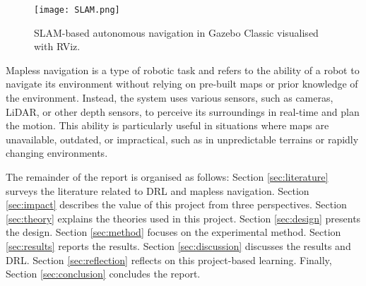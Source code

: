 \begin{figure}[htbp]
\centering
\texttt{[image: SLAM.png]}
\caption{SLAM-based autonomous navigation in Gazebo Classic visualised with RViz.}
\label{fig:slam}
\end{figure}

Mapless navigation is a type of robotic task and refers to the ability of a robot to navigate its environment without relying on pre-built maps or prior knowledge of the environment. Instead, the system uses various sensors, such as cameras, LiDAR, or other depth sensors, to perceive its surroundings in real-time and plan the motion. This ability is particularly useful in situations where maps are unavailable, outdated, or impractical, such as in unpredictable terrains or rapidly changing environments.

The remainder of the report is organised as follows: Section \ref{sec:literature} surveys the literature related to DRL and mapless navigation. Section \ref{sec:impact} describes the value of this project from three perspectives. Section \ref{sec:theory} explains the theories used in this project. Section \ref{sec:design} presents the design. Section \ref{sec:method} focuses on the experimental method. Section \ref{sec:results} reports the results. Section \ref{sec:discussion} discusses the results and DRL. Section \ref{sec:reflection} reflects on this project-based learning. Finally, Section \ref{sec:conclusion} concludes the report.
